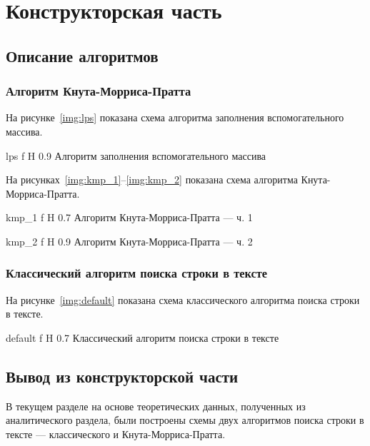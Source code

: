 \chapter{Конструкторская часть}

\section{Описание алгоритмов}

\subsection{Алгоритм Кнута-Морриса-Пратта}

На рисунке~\ref{img:lps} показана схема алгоритма заполнения вспомогательного массива.

    {lps}
    {f}
    {H}
    {0.9\textwidth}
    {Алгоритм заполнения вспомогательного массива}

На рисунках~\ref{img:kmp_1}--\ref{img:kmp_2} показана схема алгоритма Кнута-Морриса-Пратта.

    {kmp_1}
    {f}
    {H}
    {0.7\textwidth}
    {Алгоритм Кнута-Морриса-Пратта --- ч. 1}
        
    {kmp_2}
    {f}
    {H}
    {0.9\textwidth}
    {Алгоритм Кнута-Морриса-Пратта --- ч. 2}

\pagebreak
\subsection{Классический алгоритм поиска строки в тексте}

На рисунке~\ref{img:default} показана схема классического алгоритма поиска строки в тексте. 

    {default}
    {f}
    {H}
    {0.7\textwidth}
    {Классический алгоритм поиска строки в тексте}

\section*{Вывод из конструкторской части}

В текущем разделе на основе теоретических данных, полученных из аналитического раздела, были построены схемы двух алгоритмов поиска строки в тексте --- классического и Кнута-Морриса-Пратта.
